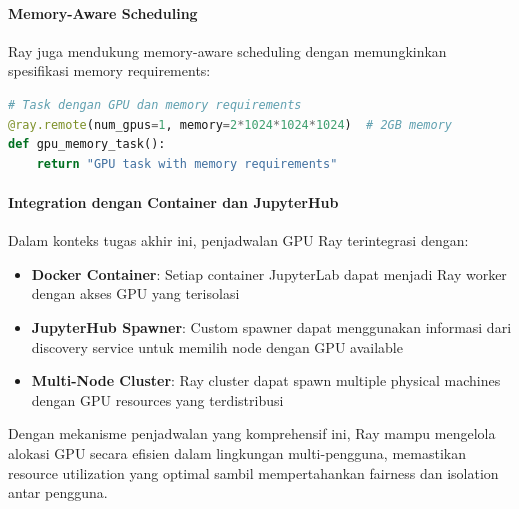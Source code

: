 \paragraph{Memory-Aware Scheduling}

Ray juga mendukung memory-aware scheduling dengan memungkinkan spesifikasi memory requirements:

\begin{lstlisting}[language=Python]
# Task dengan GPU dan memory requirements
@ray.remote(num_gpus=1, memory=2*1024*1024*1024)  # 2GB memory
def gpu_memory_task():
    return "GPU task with memory requirements"
\end{lstlisting}

\paragraph{Integration dengan Container dan JupyterHub}

Dalam konteks tugas akhir ini, penjadwalan GPU Ray terintegrasi dengan:
\begin{itemize}
\item \textbf{Docker Container}: Setiap container JupyterLab dapat menjadi Ray worker dengan akses GPU yang terisolasi
\item \textbf{JupyterHub Spawner}: Custom spawner dapat menggunakan informasi dari discovery service untuk memilih node dengan GPU available
\item \textbf{Multi-Node Cluster}: Ray cluster dapat spawn multiple physical machines dengan GPU resources yang terdistribusi
\end{itemize}

Dengan mekanisme penjadwalan yang komprehensif ini, Ray mampu mengelola alokasi GPU secara efisien dalam lingkungan multi-pengguna, memastikan resource utilization yang optimal sambil mempertahankan fairness dan isolation antar pengguna.